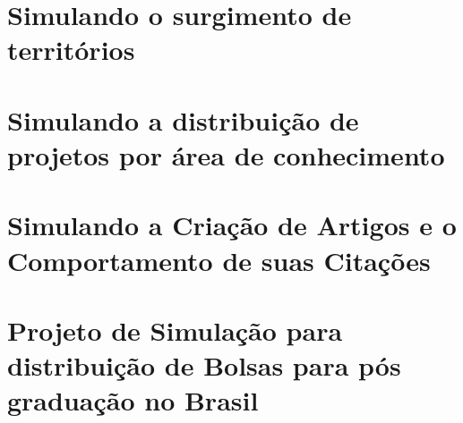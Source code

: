     \chapter{Simulando o surgimento de territórios\label{PlanejamentoSimulSurgemOsTerritorios}}

	

    \chapter{Simulando a distribuição de projetos por área de conhecimento}
    
    
    
    \chapter{Simulando a Criação de Artigos e o Comportamento de suas Citações}
    
    
    
     \chapter{Projeto de Simulação para distribuição de Bolsas para pós graduação no Brasil}
    
    